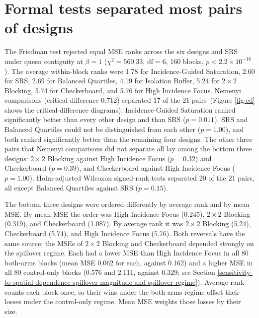 \documentclass[11pt]{article}
\begin{document}
\FloatBarrier
\section{Formal tests separated most pairs of designs}\label{formal-statistical-comparison}\label{app:supp-comparisons}


The Friedman test rejected equal MSE ranks across the six designs and SRS under
queen contiguity at \(\beta = 1\) (\(\chi^2 = 560.33\),
\(\text{df} = 6\), 160 blocks, \(p < 2.2\times10^{-16}\)). The average
within-block ranks were 1.78 for Incidence-Guided Saturation, 2.60 for SRS,
2.69 for Balanced Quartiles, 4.19 for Isolation Buffer, 5.24 for
\(2\times2\) Blocking, 5.74 for Checkerboard, and 5.76 for High
Incidence Focus. Nemenyi comparisons (critical difference 0.712)
separated 17 of the 21 pairs\iffullsi\ (Figure \ref{fig:cd} shows
the critical-difference diagrams)\fi. Incidence-Guided Saturation
ranked significantly better than every other design and than SRS (\(p = 0.011\)). SRS and Balanced
Quartiles could not be distinguished from each other (\(p = 1.00\)), and both ranked significantly
better than the remaining four designs. The other three pairs that Nemenyi comparisons
did not separate all lay among the bottom three designs: \(2\times2\)
Blocking against High Incidence Focus (\(p = 0.32\)) and Checkerboard (\(p = 0.39\)), and Checkerboard
against High Incidence Focus (\(p = 1.00\)). Holm-adjusted Wilcoxon
signed-rank tests separated 20 of the 21 pairs, all except Balanced Quartiles against SRS (\(p = 0.15\)).

The bottom three designs were ordered differently by average rank and by
mean MSE. By mean MSE the order was High Incidence Focus (0.245),
\(2\times2\) Blocking (0.319), and Checkerboard (1.087). By average rank
it was \(2\times2\) Blocking (5.24), Checkerboard (5.74), and High
Incidence Focus (5.76). Both reversals have the same source: the MSEs of
\(2\times2\) Blocking and Checkerboard depended strongly on the
spillover regime. Each had a lower MSE than High Incidence Focus in all
80 both-arms blocks (mean MSE 0.062 for each, against 0.162) and a
higher MSE in all 80 control-only blocks (0.576 and 2.111, against
0.329; see Section \ref{sensitivity-to-spatial-dependence-spillover-magnitude-and-spillover-regime}). Average rank counts each
block once, so their wins under the both-arms regime offset their losses
under the control-only regime. Mean MSE weights those losses by their
size.
\end{document}
